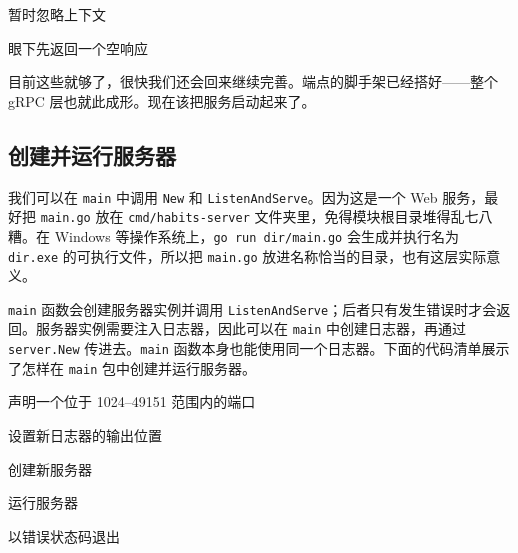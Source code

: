 \begin{codeannotations}
\item 暂时忽略上下文
\item 眼下先返回一个空响应
\end{codeannotations}

目前这些就够了，很快我们还会回来继续完善。端点的脚手架已经搭好——整个 gRPC 层也就此成形。现在该把服务启动起来了。

\subsection{创建并运行服务器}

我们可以在 \texttt{main} 中调用 \texttt{New} 和 \texttt{ListenAndServe}。因为这是一个 Web 服务，最好把 \texttt{main.go} 放在 \texttt{cmd/habits-server} 文件夹里，免得模块根目录堆得乱七八糟。在 Windows 等操作系统上，\texttt{go run dir/main.go} 会生成并执行名为 \texttt{dir.exe} 的可执行文件，所以把 \texttt{main.go} 放进名称恰当的目录，也有这层实际意义。

\texttt{main} 函数会创建服务器实例并调用 \texttt{ListenAndServe}；后者只有发生错误时才会返回。服务器实例需要注入日志器，因此可以在 \texttt{main} 中创建日志器，再通过 \texttt{server.New} 传进去。\texttt{main} 函数本身也能使用同一个日志器。下面的代码清单展示了怎样在 \texttt{main} 包中创建并运行服务器。


\begin{codeannotations}
\item 声明一个位于 1024--49151 范围内的端口
\item 设置新日志器的输出位置
\item 创建新服务器
\item 运行服务器
\item 以错误状态码退出
\end{codeannotations}

